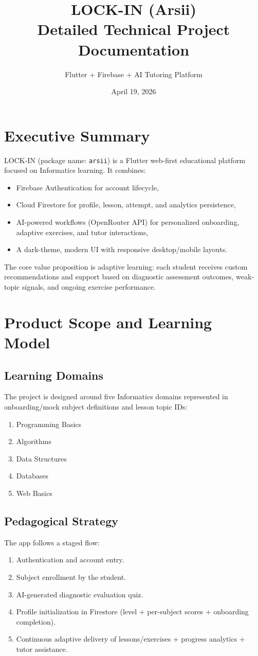 \documentclass[11pt,a4paper]{article}
\title{\textbf{LOCK-IN (Arsii)\\Detailed Technical Project Documentation}}
\author{Flutter + Firebase + AI Tutoring Platform}
\date{April 19, 2026}
\begin{document}
\maketitle
\tableofcontents
\newpage

\section{Executive Summary}
LOCK-IN (package name: \texttt{arsii}) is a Flutter web-first educational platform focused on Informatics learning. It combines:
\begin{itemize}
  \item Firebase Authentication for account lifecycle,
  \item Cloud Firestore for profile, lesson, attempt, and analytics persistence,
  \item AI-powered workflows (OpenRouter API) for personalized onboarding, adaptive exercises, and tutor interactions,
  \item A dark-theme, modern UI with responsive desktop/mobile layouts.
\end{itemize}

The core value proposition is adaptive learning: each student receives custom recommendations and support based on diagnostic assessment outcomes, weak-topic signals, and ongoing exercise performance.

\section{Product Scope and Learning Model}
\subsection{Learning Domains}
The project is designed around five Informatics domains represented in onboarding/mock subject definitions and lesson topic IDs:
\begin{enumerate}
  \item Programming Basics
  \item Algorithms
  \item Data Structures
  \item Databases
  \item Web Basics
\end{enumerate}

\subsection{Pedagogical Strategy}
The app follows a staged flow:
\begin{enumerate}
  \item Authentication and account entry.
  \item Subject enrollment by the student.
  \item AI-generated diagnostic evaluation quiz.
  \item Profile initialization in Firestore (level + per-subject scores + onboarding completion).
  \item Continuous adaptive delivery of lessons/exercises + progress analytics + tutor assistance.
\end{enumerate}
\end{document}
